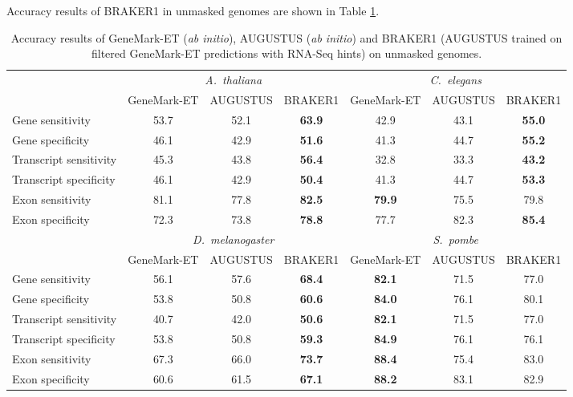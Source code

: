 \documentclass[a4paper,10pt]{report}
\begin{document}
Accuracy results of BRAKER1 in unmasked genomes are shown in Table \ref{unmasked}.

\begin{table}
\begin{center}
 \begin{scriptsize}
 \begin{tabular}{|l|ccc|ccc|}
 \hline
& \multicolumn{3}{|c|}{\textit{A.~thaliana}} & \multicolumn{3}{|c|}{\textit{C.~elegans}}\\
& GeneMark-ET & AUGUSTUS & BRAKER1 & GeneMark-ET & AUGUSTUS & BRAKER1\\
\hline
Gene sensitivity        & 53.7 & 52.1 & \textbf{63.9} & 42.9 & 43.1 & \textbf{55.0}\\
Gene specificity        & 46.1 & 42.9 & \textbf{51.6} & 41.3 & 44.7 & \textbf{55.2}\\
Transcript sensitivity  & 45.3 & 43.8 & \textbf{56.4} & 32.8 & 33.3 & \textbf{43.2}\\
Transcript specificity  & 46.1 & 42.9 & \textbf{50.4} & 41.3 & 44.7 & \textbf{53.3}\\
Exon sensitivity        & 81.1 & 77.8 & \textbf{82.5} & \textbf{79.9} & 75.5 & 79.8\\
Exon specificity        & 72.3 & 73.8 & \textbf{78.8} & 77.7 & 82.3 & \textbf{85.4}\\
\hline
& \multicolumn{3}{|c|}{\textit{D.~melanogaster}} & \multicolumn{3}{|c|}{\textit{S.~pombe}}\\
& GeneMark-ET & AUGUSTUS & BRAKER1 & GeneMark-ET & AUGUSTUS & BRAKER1\\
\hline
Gene sensitivity       & 56.1 & 57.6 & \textbf{68.4} & \textbf{82.1} & 71.5 & 77.0\\
Gene specificity       & 53.8 & 50.8 & \textbf{60.6} & \textbf{84.0} & 76.1 & 80.1\\
Transcript sensitivity & 40.7 & 42.0 & \textbf{50.6} & \textbf{82.1} & 71.5 & 77.0\\
Transcript specificity & 53.8 & 50.8 & \textbf{59.3} & \textbf{84.9} & 76.1 & 76.1\\
Exon sensitivity       & 67.3 & 66.0 & \textbf{73.7} & \textbf{88.4} & 75.4 & 83.0\\
Exon specificity       & 60.6 & 61.5 & \textbf{67.1} & \textbf{88.2} & 83.1 & 82.9\\
\hline
 \end{tabular}
\end{scriptsize}
\end{center}
\caption{Accuracy results of GeneMark-ET (\textit{ab initio}), AUGUSTUS (\textit{ab initio}) and BRAKER1 (AUGUSTUS trained on filtered GeneMark-ET predictions with RNA-Seq hints) on unmasked genomes.\label{unmasked}}
\end{table}
\end{document}
